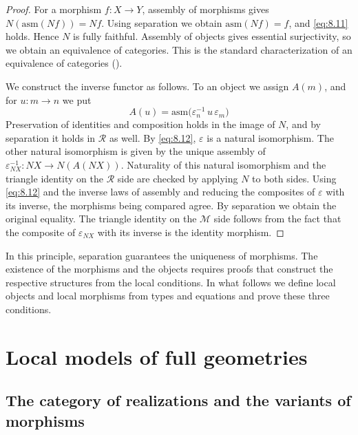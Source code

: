 \begin{proof}

For a morphism $f:X\to Y$, assembly of morphisms gives $N(\mathrm{asm}(Nf))=Nf$.
Using separation we obtain $\mathrm{asm}(Nf)=f$, and \eqref{eq:8.11} holds.
Hence $N$ is fully faithful.
Assembly of objects gives essential surjectivity, so we obtain an equivalence of categories.
This is the standard characterization of an equivalence of categories
(\cite[\href{https://stacks.math.columbia.edu/tag/02C3}{Lemma 4.2.19, Tag 02C3}]{Stacks}).

We construct the inverse functor as follows.
To an object we assign $A(m)$, and for $u:m\to n$ we put
\begin{equation*}
A(u)=
\mathrm{asm}
\bigl(\varepsilon_n^{-1}\,u\,\varepsilon_m\bigr)
\tag{8.12}\label{eq:8.12}
\end{equation*}
Preservation of identities and composition holds in the image of $N$, and by separation it
holds in $\mathcal{R}$ as well.
By \eqref{eq:8.12}, $\varepsilon$ is a natural isomorphism.
The other natural isomorphism is given by the unique assembly of
$\varepsilon_{NX}^{-1}:NX\to N(A(NX))$.
Naturality of this natural isomorphism and the triangle identity on the $\mathcal{R}$ side
are checked by applying $N$ to both sides.
Using \eqref{eq:8.12} and the inverse laws of assembly and reducing the composites of
$\varepsilon$ with its inverse, the morphisms being compared agree.
By separation we obtain the original equality. The triangle identity on the $\mathcal{M}$
side follows from the fact that the composite of $\varepsilon_{NX}$ with its inverse is the
identity morphism.

\end{proof}

In this principle, separation guarantees the uniqueness of morphisms.
The existence of the morphisms and the objects requires proofs that construct the respective
structures from the local conditions.
In what follows we define local objects and local morphisms from types and equations and
prove these three conditions.

\section{Local models of full geometries}\label{sec:8.4}

\subsection*{The category of realizations and the variants of morphisms}

